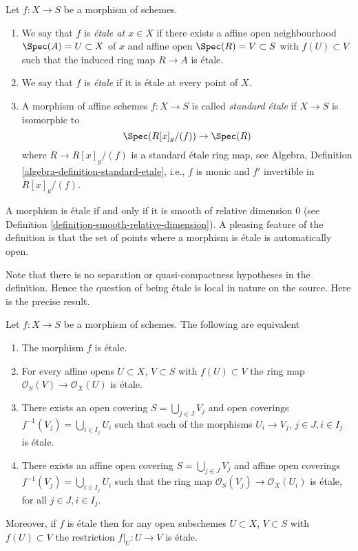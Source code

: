 \begin{definition}
\label{definition-etale}
Let $f : X \to S$ be a morphism of schemes.
\begin{enumerate}
\item We say that $f$ is {\it \'etale at $x \in X$} if
there exists a affine open neighbourhood $\Spec(A) = U \subset X$
of $x$ and affine open $\Spec(R) = V \subset S$
with $f(U) \subset V$ such that the induced ring map
$R \to A$ is \'etale.
\item We say that $f$ is {\it \'etale} if it is \'etale at every point of $X$.
\item A morphism of affine schemes $f : X \to S$ is called
{\it standard \'etale} if $X \to S$ is isomorphic to
$$
\Spec(R[x]_g/(f)) \to \Spec(R)
$$
where $R \to R[x]_g/(f)$ is a standard \'etale ring map, see
Algebra, Definition \ref{algebra-definition-standard-etale},
i.e., $f$ is monic and $f'$ invertible in $R[x]_g/(f)$.
\end{enumerate}
\end{definition}

\noindent
A morphism is \'etale if and only if it is smooth of relative dimension $0$
(see Definition \ref{definition-smooth-relative-dimension}).
A pleasing feature of the definition is that the set of points
where a morphism is \'etale is automatically open.

\medskip\noindent
Note that there is no separation or quasi-compactness hypotheses in the
definition. Hence the question of being \'etale is local in nature on
the source. Here is the precise result.

\begin{lemma}
\label{lemma-etale-characterize}
Let $f : X \to S$ be a morphism of schemes.
The following are equivalent
\begin{enumerate}
\item The morphism $f$ is \'etale.
\item For every affine opens $U \subset X$, $V \subset S$
with $f(U) \subset V$ the ring map
$\mathcal{O}_S(V) \to \mathcal{O}_X(U)$ is \'etale.
\item There exists an open covering $S = \bigcup_{j \in J} V_j$
and open coverings $f^{-1}(V_j) = \bigcup_{i \in I_j} U_i$ such
that each of the morphisms $U_i \to V_j$, $j\in J, i\in I_j$
is \'etale.
\item There exists an affine open covering $S = \bigcup_{j \in J} V_j$
and affine open coverings $f^{-1}(V_j) = \bigcup_{i \in I_j} U_i$ such
that the ring map $\mathcal{O}_S(V_j) \to \mathcal{O}_X(U_i)$ is
\'etale, for all $j\in J, i\in I_j$.
\end{enumerate}
Moreover, if $f$ is \'etale then for
any open subschemes $U \subset X$, $V \subset S$ with $f(U) \subset V$
the restriction $f|_U : U \to V$ is \'etale.
\end{lemma}

